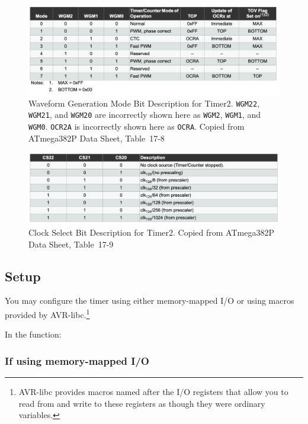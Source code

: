 \begin{figure}[p]
    \centering
    \includegraphics[width=15cm]{WGM-Timer2}
    \caption{Waveform Generation Mode Bit Description for Timer2. \texttt{WGM22}, \texttt{WGM21}, and \texttt{WGM20} are incorrectly shown here as \texttt{WGM2}, \texttt{WGM1}, and \texttt{WGM0}. \texttt{OCR2A} is incorrectly shown here as \texttt{OCRA}. \tiny Copied from ATmega382P Data Sheet, Table~17-8 \label{fig:Timer2WGM}}
\end{figure}

\begin{figure}[p]
    \centering
    \includegraphics[width=15cm]{CS-Timer2}
    \caption{Clock Select Bit Description for Timer2. \tiny Copied from ATmega382P Data Sheet, Table~17-9 \label{fig:Timer2CS}}
\end{figure}

\subsection{Setup}

You may configure the timer using either memory-mapped I/O or using macros
provided by AVR-libc.\footnote{AVR-libc provides macros named after the I/O
registers that allow you to read from and write to these registers as though
they were ordinary variables.}

In the  function:

\subsubsection{If using memory-mapped I/O}

